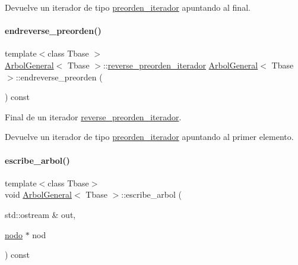 \begin{DoxyReturn}{Devuelve}
un iterador de tipo \hyperlink{classArbolGeneral_1_1preorden__iterador}{preorden\+\_\+iterador} apuntando al final. 
\end{DoxyReturn}
\hypertarget{classArbolGeneral_ace49548e1d382c65bab7b9df6b9ff353}{}\label{classArbolGeneral_ace49548e1d382c65bab7b9df6b9ff353} 
\paragraph{\texorpdfstring{endreverse\+\_\+preorden()}{endreverse\_preorden()}}
{\footnotesize\ttfamily template$<$class Tbase $>$ \\
\hyperlink{classArbolGeneral}{Arbol\+General}$<$ Tbase $>$\+::\hyperlink{classArbolGeneral_1_1reverse__preorden__iterador}{reverse\+\_\+preorden\+\_\+iterador} \hyperlink{classArbolGeneral}{Arbol\+General}$<$ Tbase $>$\+::endreverse\+\_\+preorden (\begin{DoxyParamCaption}{ }\end{DoxyParamCaption}) const}



Final de un iterador \hyperlink{classArbolGeneral_1_1reverse__preorden__iterador}{reverse\+\_\+preorden\+\_\+iterador}. 

\begin{DoxyReturn}{Devuelve}
un iterador de tipo \hyperlink{classArbolGeneral_1_1preorden__iterador}{preorden\+\_\+iterador} apuntando al primer elemento. 
\end{DoxyReturn}
\hypertarget{classArbolGeneral_abac6b7ce1205ab23ad535a431e3038c7}{}\label{classArbolGeneral_abac6b7ce1205ab23ad535a431e3038c7} 
\paragraph{\texorpdfstring{escribe\+\_\+arbol()}{escribe\_arbol()}}
{\footnotesize\ttfamily template$<$class Tbase$>$ \\
void \hyperlink{classArbolGeneral}{Arbol\+General}$<$ Tbase $>$\+::escribe\+\_\+arbol (\begin{DoxyParamCaption}\item[{std\+::ostream \&}]{out,  }\item[{\hyperlink{structArbolGeneral_1_1nodo}{nodo} $\ast$}]{nod }\end{DoxyParamCaption}) const\hspace{0.3cm}{\ttfamily [private]}}




